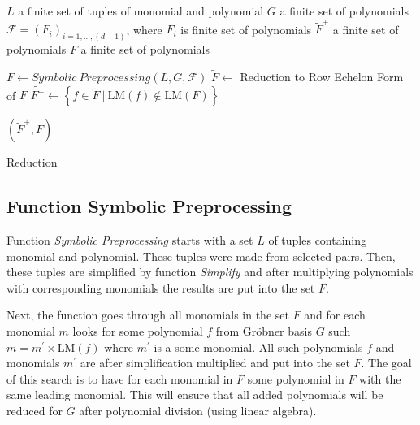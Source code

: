 \begin{algorithm}[ht]
  \begin{algorithmic}[1]
    \Require
      \Statex $L$ a finite set of tuples of monomial and polynomial
      \Statex $G$ a finite set of polynomials
      \Statex $\mathcal{F} = (F_i)_{i=1,\ldots,(d-1)}$, where $F_i$ is finite set of polynomials
    \Ensure
      \Statex $\tilde{F}^+$ a finite set of polynomials
      \Statex $F$ a finite set of polynomials
      \Statex

    \State $F \gets Symbolic\ Preprocessing(L, G, \mathcal{F})$
    \State $\tilde{F} \gets$ Reduction to Row Echelon Form of $F$
    \State $\tilde{F^+} \gets \left\{f \in \tilde{F}\ |\ \textrm{LM}(f) \notin \textrm{LM}(F)\right\}$

    \State \Return $(\tilde{F}^+, F)$

  \end{algorithmic}
  \caption{Reduction}
\end{algorithm}

\subsection{Function Symbolic Preprocessing}
Function \textit{Symbolic Preprocessing} starts with a set $L$ of tuples containing monomial and polynomial. These tuples were made from selected pairs. Then, these tuples are simplified by function \textit{Simplify} and after multiplying polynomials with corresponding monomials the results are put into the set $F$.

Next, the function goes through all monomials in the set $F$ and for each monomial $m$ looks for some polynomial $f$ from Gr\"obner basis $G$ such $m = m^\prime \times \textrm{LM}(f)$ where $m^\prime$ is a some monomial. All such polynomials $f$ and monomials $m^\prime$ are after simplification multiplied and put into the set $F$. The goal of this search is to have for each monomial in $F$ some polynomial in $F$ with the same leading monomial. This will ensure that all added polynomials will be reduced for $G$ after polynomial division (using linear algebra).

